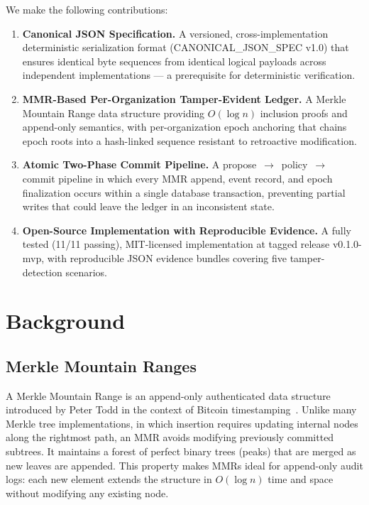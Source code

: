 \documentclass[sigconf,natbib=false]{acmart}
\begin{document}
We make the following contributions:

\begin{enumerate}
\item \textbf{Canonical JSON Specification.} A versioned, cross-implementation
  deterministic serialization format (CANONICAL\_JSON\_SPEC v1.0) that
  ensures identical byte sequences from identical logical payloads across
  independent implementations --- a prerequisite for deterministic verification.

\item \textbf{MMR-Based Per-Organization Tamper-Evident Ledger.} A Merkle
  Mountain Range data structure providing $O(\log n)$ inclusion proofs and
  append-only semantics, with per-organization epoch anchoring that chains
  epoch roots into a hash-linked sequence resistant to retroactive modification.

\item \textbf{Atomic Two-Phase Commit Pipeline.} A propose~$\to$~policy~$\to$
  commit pipeline in which every MMR append, event record, and epoch
  finalization occurs within a single database transaction, preventing partial
  writes that could leave the ledger in an inconsistent state.

\item \textbf{Open-Source Implementation with Reproducible Evidence.} A fully
  tested (11/11 passing), MIT-licensed implementation at tagged release
  v0.1.0-mvp, with reproducible JSON evidence bundles covering five
  tamper-detection scenarios.
\end{enumerate}

\section{Background}

\subsection{Merkle Mountain Ranges}

A Merkle Mountain Range is an append-only authenticated data structure
introduced by Peter Todd in the context of Bitcoin timestamping~\cite{todd2013}.
Unlike many Merkle tree implementations, in which insertion requires updating
internal nodes along the rightmost path, an MMR avoids modifying previously
committed subtrees. It maintains a forest of perfect binary trees (peaks)
that are merged as new leaves are appended. This property makes MMRs ideal
for append-only audit logs: each new element extends the structure in
$O(\log n)$ time and space without modifying any existing node.
\end{document}
